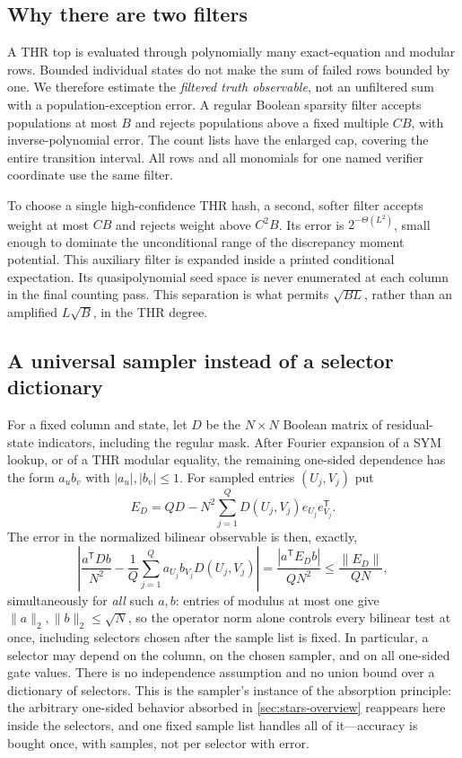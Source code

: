 \documentclass[11pt,letterpaper]{article}
\theoremstyle{definition}
\theoremstyle{remark}
\begin{document}
\subsection{Why there are two filters}
A THR top is evaluated through polynomially many exact-equation and
modular rows. Bounded individual states do not make the sum of failed
rows bounded by one. We therefore estimate the \emph{filtered truth
observable}, not an unfiltered sum with a population-exception error.
A regular Boolean sparsity filter accepts populations at most $B$ and
rejects populations above a fixed multiple $CB$, with inverse-polynomial
error. The count lists have the enlarged cap, covering the entire
transition interval. All rows and all monomials for one named verifier
coordinate use the same filter.

To choose a single high-confidence THR hash, a second, softer filter
accepts weight at most $CB$ and rejects weight above $C^2B$. Its error
is $2^{-\Theta(L^2)}$, small enough to dominate the unconditional range
of the discrepancy moment potential. This auxiliary filter is expanded
inside a printed conditional expectation. Its quasipolynomial seed
space is never enumerated at each column in the final counting pass.
This separation is what permits $\sqrt{BL}$, rather than an amplified
$L\sqrt B$, in the THR degree.

\subsection{A universal sampler instead of a selector dictionary}
For a fixed column and state, let $D$ be the $N\times N$ Boolean matrix
of residual-state indicators, including the regular mask. After Fourier
expansion of a SYM lookup, or of a THR modular equality, the remaining
one-sided dependence has the form $a_u b_v$ with $|a_u|,|b_v|\le1$.
For sampled entries $(U_j,V_j)$ put
\[
E_D=QD-N^2\sum_{j=1}^Q D(U_j,V_j)e_{U_j}e_{V_j}^{\mathsf T}.
\]
The error in the normalized bilinear observable is then, exactly,
\[
\left|\frac{a^{\mathsf T}Db}{N^2}
-\frac1Q\sum_{j=1}^Q a_{U_j}b_{V_j}D(U_j,V_j)\right|
=\frac{|a^{\mathsf T}E_Db|}{QN^2}
\le\frac{\|E_D\|}{QN},
\]
simultaneously for \emph{all} such $a,b$: entries of modulus at most
one give $\|a\|_2,\|b\|_2\le\sqrt N$, so the operator norm alone
controls every bilinear test at once, including selectors chosen
after the sample list is fixed. In
particular, a selector may depend on the column, on the chosen
sampler, and on all one-sided gate values. There is no independence
assumption and no union bound over a dictionary of selectors. This is
the sampler's instance of the absorption principle: the arbitrary
one-sided behavior absorbed in \cref{sec:stars-overview} reappears
here inside the selectors, and one fixed sample list handles all of
it---accuracy is bought once, with samples, not per selector with
error.
\end{document}

